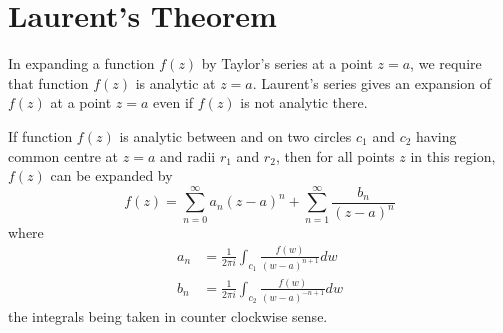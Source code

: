 \section{Laurent's Theorem}
In expanding a function $f(z)$ by Taylor's series at a point $z=a$, we require that function $f(z)$ is analytic at $z=a$. Laurent's series gives an expansion of $f(z)$ at a point $z=a$ even if $f(z)$ is not analytic there.
\begin{theorem}
If function $f(z)$ is analytic between and on two circles $c_1$ and $c_2$ having common centre at $z=a$ and  radii $r_1$ and $r_2$, then for all points $z$ in this region, $f(z)$ can be expanded by
\[f(z) = \sum_{n=0}^{\infty}a_n (z-a)^n + \sum_{n=1}^{\infty} \frac{b_n}{(z-a)^n} \]
where
\begin{align*}
	a_n &= \frac{1}{2\pi i} \int_{c_1}\frac{f(w)}{(w-a)^{n+1}} dw \\
	b_n &= \frac{1}{2\pi i} \int_{c_2}\frac{f(w)}{(w-a)^{-n+1}} dw 
\end{align*}
the integrals being taken in counter clockwise sense.
\end{theorem}
